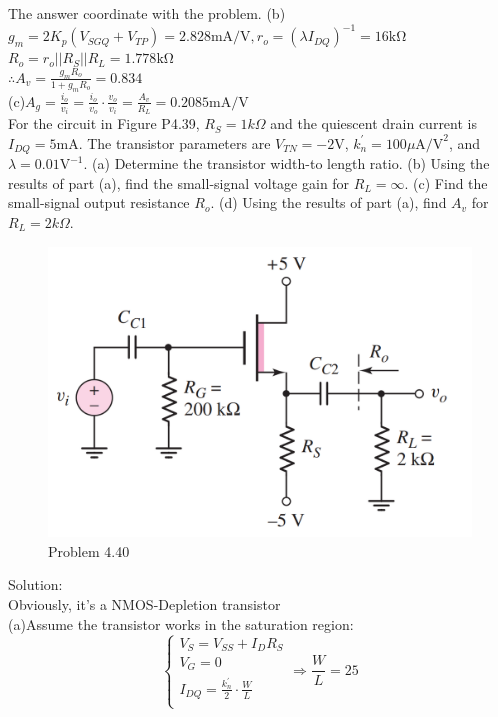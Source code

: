 \documentclass[a4paper,11pt,UTF8]{article}
\begin{document}
The answer coordinate with the problem.
(b)$g_m=2K_p(V_{SGQ}+V_{TP})=2.828\mathrm{mA/V}, r_o=(\lambda I_{DQ})^{-1}=16\mathrm{k\Omega}$
$R_o=r_o||R_S||R_L=1.778\mathrm{k\Omega}$\\
$\therefore A_v=\frac{g_mR_o}{1+g_mR_o}=0.834$\\
(c)$\displaystyle A_g=\frac{i_o}{v_i}=\frac{i_o}{v_o}\cdot\frac{v_o}{v_i}=\frac{A_v}{R_L}=0.2085\mathrm{mA/V}$\\
 For the circuit in Figure P4.39, $R_S = 1 k\Omega$ and the quiescent drain current
is $I_{DQ} = 5 \mathrm{mA}$. The transistor parameters are $V_{T N} = -2 $V,
$k^\prime_n = 100\mu \mathrm{A/V}^2$, and $ \lambda = 0.01 \mathrm{V}^{-1}$. (a) Determine the transistor width-to length ratio. (b) Using the results of part (a), find the small-signal voltage gain for $R_L = \infty$. (c) Find the small-signal output resistance $R_o$. (d) Using
the results of part (a), find $A_v$ for $R_L = 2 k\Omega$.\\
\begin{figure}[H] 
	\centering 
	\includegraphics[scale=0.3]{MD4.40.png}
	\caption{Problem 4.40}
\end{figure}
\noindent Solution:\\
Obviously, it's a NMOS-Depletion transistor\\
(a)Assume the transistor works in the saturation region:
$$\begin{cases}
	V_S=V_{SS}+I_DR_S\\
	V_G=0\\
	\displaystyle I_{DQ}=\frac{k^\prime_n}{2}\cdot\frac{W}{L}\\
\end{cases}\Rightarrow\displaystyle \frac{W}{L}=25
$$
\end{document}
